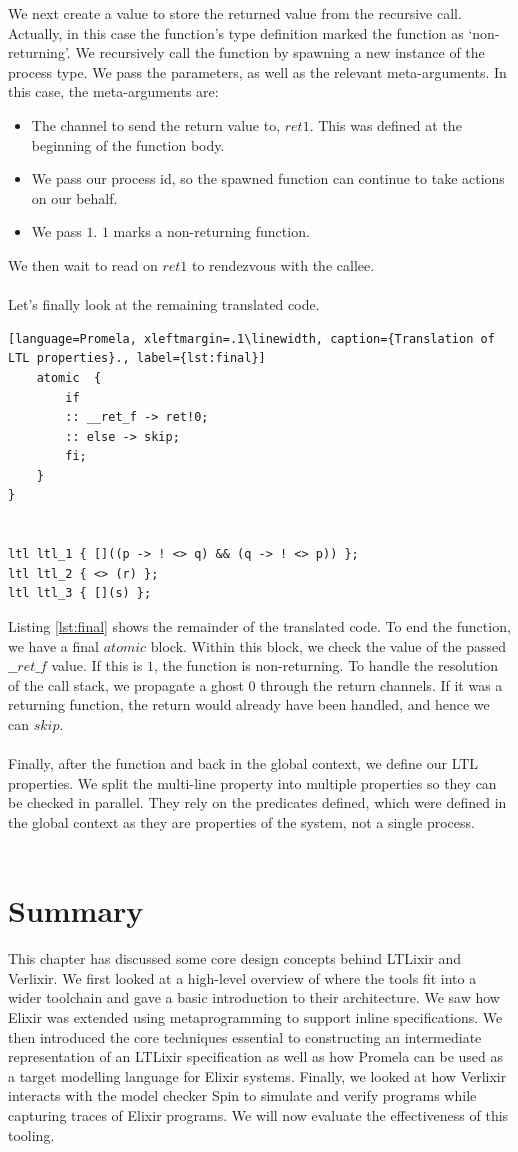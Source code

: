 We next create a value to store the returned value from the recursive call. Actually, in this case the function's type definition marked the function as `non-returning'. We recursively call the function by spawning a new instance of the process type. We pass the parameters, as well as the relevant meta-arguments. In this case, the meta-arguments are:
\begin{itemize}
    \item The channel to send the return value to, $ret1$. This was defined at the beginning of the function body.
    \item We pass our process id, so the spawned function can continue to take actions on our behalf.
    \item We pass $1$. $1$ marks a non-returning function.
\end{itemize}
We then wait to read on $ret1$ to rendezvous with the callee.
\\ \\
Let's finally look at the remaining translated code.
\begin{lstlisting}[language=Promela, xleftmargin=.1\linewidth, caption={Translation of LTL properties}., label={lst:final}]
    atomic  {
        if
        :: __ret_f -> ret!0;
        :: else -> skip;
        fi;
    }
}


ltl ltl_1 { []((p -> ! <> q) && (q -> ! <> p)) };
ltl ltl_2 { <> (r) };
ltl ltl_3 { [](s) };
\end{lstlisting}
Listing \ref{lst:final} shows the remainder of the translated code. To end the function, we have a final $atomic$ block. Within this block, we check the value of the passed $\_\_ret\_f$ value. If this is $1$, the function is non-returning. To handle the resolution of the call stack, we propagate a ghost $0$ through the return channels. If it was a returning function, the return would already have been handled, and hence we can $skip$.
\\ \\
Finally, after the function and back in the global context, we define our LTL properties. We split the multi-line property into multiple properties so they can be checked in parallel. They rely on the predicates defined, which were defined in the global context as they are properties of the system, not a single process.
\\ \\
\section{Summary}
This chapter has discussed some core design concepts behind LTLixir and Verlixir. We first looked at a high-level overview of where the tools fit into a wider toolchain and gave a basic introduction to their architecture. We saw how Elixir was extended using metaprogramming to support inline specifications. We then introduced the core techniques essential to constructing an intermediate representation of an LTLixir specification as well as how Promela can be used as a target modelling language for Elixir systems. Finally, we looked at how Verlixir interacts with the model checker Spin to simulate and verify programs while capturing traces of Elixir programs. We will now evaluate the effectiveness of this tooling.
